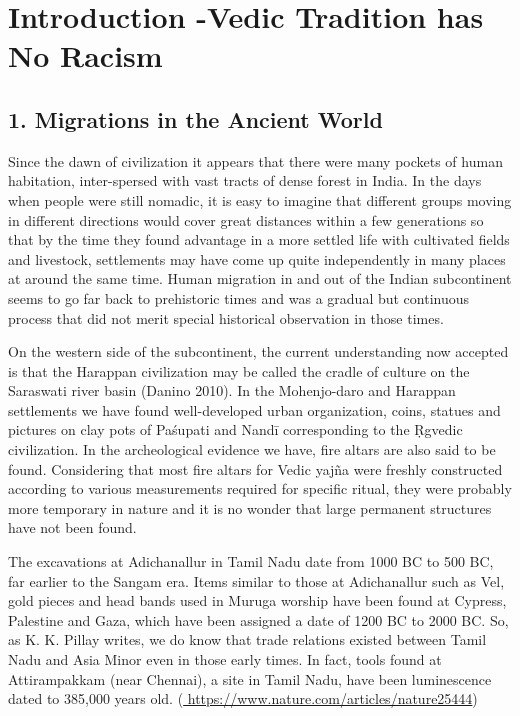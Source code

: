 
\chapter{Introduction -\break Vedic Tradition has No Racism}\label{intro}



\section*{1. Migrations in the Ancient World}

Since the dawn of civilization it appears that there were many pockets of human habitation, inter-spersed with vast tracts of dense forest in India. In the days when people were still nomadic, it is easy to imagine that different groups moving in different directions would cover great distances within a few generations so that by the time they found advantage in a more settled life with cultivated fields and livestock, settlements may have come up quite independently in many places at around the same time. Human migration in and out of the Indian subcontinent seems to go far back to prehistoric times and was a gradual but continuous process that did not merit special historical observation in those times.

On the western side of the subcontinent, the current understanding now accepted is that the Harappan civilization may be called the cradle of culture on the Saraswati river basin (Danino 2010). In the Mohenjo-daro and Harappan settlements we have found well-developed urban organization, coins, statues and pictures on clay pots of Paśupati and Nandī corresponding to the Ṛgvedic civilization. In the archeological evidence we have, fire altars are also said to be found. Considering that most fire altars for Vedic yajña were freshly constructed according to various measurements required for specific ritual, they were probably more temporary in nature and it is no wonder that large permanent structures have not been found.

\newpage

The excavations at Adichanallur in Tamil Nadu date from 1000 BC to 500 BC, far earlier to the Sangam era. Items similar to those at Adichanallur such as Vel, gold pieces and head bands used in Muruga worship have been found at Cypress, Palestine and Gaza, which have been assigned a date of 1200 BC to 2000 BC. So, as K. K. Pillay writes, we do know that trade relations existed between Tamil Nadu and Asia Minor even in those early times. In fact, tools found at Attirampakkam (near Chennai), a site in Tamil Nadu, have been luminescence dated to 385,000 years old. (\url{ https://www.nature.com/articles/nature25444})

